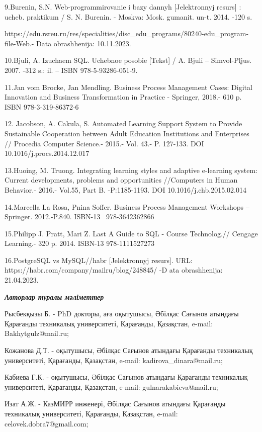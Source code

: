 9.Burenin, S.N. Web-programmirovanie i bazy dannyh {[}Jelektronnyj
resurs{]} : ucheb. praktikum / S. N. Burenin. - Moskva: Mosk. gumanit.
un-t. 2014. -120 s.

https://edu.rsreu.ru/res/specialities/disc\_edu\_programs/80240-edu\_program-file-Web.-
Data obrashhenija: 10.11.2023.

10.B\textquotesingle juli, A. Izuchaem SQL. Uchebnoe posobie {[}Tekst{]}
/ A. B\textquotesingle juli -- Simvol-Pljus. 2007. -312 s.: il. -- ISBN
978-5-93286-051-9.

11.Jan vom Brocke, Jan Mendling. Business Process Management Cases:
Digital Innovation and Business Transformation in Practice - Springer,
2018.- 610 p. ISBN 978-3-319-86372-6

12. Jacobson, A. Cakula, S. Automated Learning Support System to Provide
Sustainable Cooperation between Adult Education Institutions and
Enterprises // Procedia Computer Science.- 2015.- Vol. 43.- P. 127-133.
DOI 10.1016/j.procs.2014.12.017

13.Huoing, M. Truong. Integrating learning styles and adaptive
e-learning system: Current developments, problems and opportunities
//Computers in Human Behavior.- 2016.- Vol.55, Part B. -P:1185-1193. DOI
10.1016/j.chb.2015.02.014

14.Marcella La Rosa, Pnina Soffer. Business Process Management Workshops
-- Springer. 2012.-P.840. ISBN-13 ‎~978-3642362866

15.Philipp J. Pratt, Mari Z. Last A Guide to SQL - Course Technolog.//
Cengage Learning.- 320 p. 2014. ISBN-13 978-1111527273

16.PostgreSQL vs MySQL//habr {[}Jelektronnyj resurs{]}. URL:
https://habr.com/company/mailru/blog/248845/ -D ata obrashhenija:
21.04.2023.

\emph{{\bfseries Авторлар туралы мәліметтер}}

Рысбекқызы Б. - PhD докторы, аға оқытушысы, Әбілқас Сағынов атындағы
Қарағанды техникалық университеті, Қарағанды, Қазақстан, e-mail:
Bakhytgulz@mail.ru;

Кожанова Д.Т. - оқытушысы, Әбілқас Сағынов атындағы Қарағанды техникалық
университеті, Қарағанды, Қазақстан, e-mail: kadirova\_dinara@mail.ru;

Кабиева Г.К. - оқытушысы, Әбілқас Сағынов атындағы Қарағанды техникалық
университеті, Қарағанды, Қазақстан, e-mail: gulnarakabieva@mail.ru;

Изат А.Ж. - КазМИРР инженері, Әбілқас Сағынов атындағы Қарағанды
техникалық университеті, Қарағанды, Қазақстан, e-mail:
celovek.dobra7@gmail.com;

